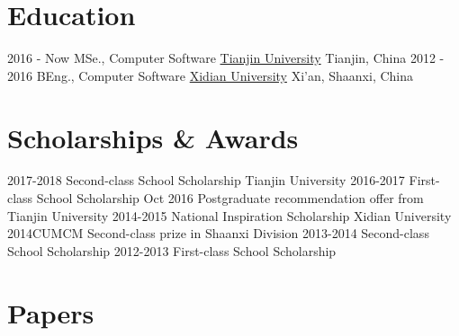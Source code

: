\documentclass[utf8]{twentysecondcv} %
\begin{document}
\makeprofile %

\section{Education}

\begin{twenty} %
    \twentyitem
        {2016 - Now}
        {MSe., Computer Software}
        {\href{http://tju.edu.cn/}{Tianjin University}}
        {Tianjin, China}
        {}
    \twentyitem
        {2012 - 2016}
        {BEng., Computer Software}
        {\href{http://www.xidian.edu.cn/}{Xidian University}}
        {Xi'an, Shaanxi, China}
        {}
\end{twenty}



\section{Scholarships \& Awards}

\begin{twenty}
    \twentyitem
        {2017-2018}
        {Second-class School Scholarship}
        {Tianjin University}
        {}
        {}
    \twentyitem
        {2016-2017}
        {First-class School Scholarship}
        {}
        {}
        {}
    \twentyitem
        {Oct 2016}
        {Postgraduate recommendation offer from Tianjin University}
        {}
        {}
        {}
    \twentyitem
        {2014-2015}
        {National Inspiration Scholarship}
        {Xidian University}
        {}
        {}
    \twentyitem
        {2014CUMCM}
        {Second-class prize in Shaanxi Division}
        {}
        {}
        {}
    \twentyitem
        {2013-2014}  
        {Second-class School Scholarship}
        {}
        {}
        {}
    \twentyitem        
        {2012-2013}
        {First-class School Scholarship}
        {}
        {}
        {}        
\end{twenty}

\section{Papers}
\end{document}
